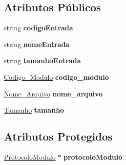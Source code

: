 \subsection*{\-Atributos \-Públicos}
\begin{DoxyCompactItemize}
\item 
\hypertarget{class_cntr_int_modulo_a1eb1b5c91e5b3e28dc0b942df1e3f1f7}{
string {\bfseries codigo\-Entrada}}
\label{class_cntr_int_modulo_a1eb1b5c91e5b3e28dc0b942df1e3f1f7}

\item 
\hypertarget{class_cntr_int_modulo_aff726cb02945c2693475c581d2394aca}{
string {\bfseries nome\-Entrada}}
\label{class_cntr_int_modulo_aff726cb02945c2693475c581d2394aca}

\item 
\hypertarget{class_cntr_int_modulo_a00cd88d0b1eb9d98555a2f2a0ea14ced}{
string {\bfseries tamanho\-Entrada}}
\label{class_cntr_int_modulo_a00cd88d0b1eb9d98555a2f2a0ea14ced}

\item 
\hypertarget{class_cntr_int_modulo_a6def2162909614ff31f6719ee97ac952}{
\hyperlink{class_codigo___modulo}{\-Codigo\-\_\-\-Modulo} {\bfseries codigo\-\_\-modulo}}
\label{class_cntr_int_modulo_a6def2162909614ff31f6719ee97ac952}

\item 
\hypertarget{class_cntr_int_modulo_a94d5c230b0f15f16aa9484924665e1e6}{
\hyperlink{class_nome___arquivo}{\-Nome\-\_\-\-Arquivo} {\bfseries nome\-\_\-arquivo}}
\label{class_cntr_int_modulo_a94d5c230b0f15f16aa9484924665e1e6}

\item 
\hypertarget{class_cntr_int_modulo_a4a54d3d19836141c6c8d9a8fdb8e4777}{
\hyperlink{class_tamanho}{\-Tamanho} {\bfseries tamanho}}
\label{class_cntr_int_modulo_a4a54d3d19836141c6c8d9a8fdb8e4777}

\end{DoxyCompactItemize}
\subsection*{\-Atributos \-Protegidos}
\begin{DoxyCompactItemize}
\item 
\hypertarget{class_cntr_int_modulo_a814c981835b26c196cb0df7c18456485}{
\hyperlink{class_protocolo_modulo}{\-Protocolo\-Modulo} $\ast$ {\bfseries protocolo\-Modulo}}
\label{class_cntr_int_modulo_a814c981835b26c196cb0df7c18456485}

\end{DoxyCompactItemize}


